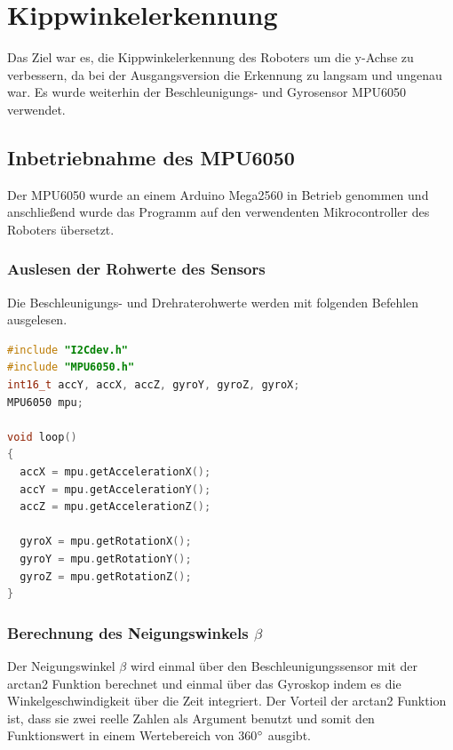 

\newpage
\renewcommand{\autoren}{Severin Schendel}

\section{Kippwinkelerkennung}

Das Ziel war es, die Kippwinkelerkennung des Roboters um die y-Achse zu verbessern, da bei der Ausgangsversion die Erkennung zu langsam und ungenau war. Es wurde weiterhin der Beschleunigungs- und Gyrosensor MPU6050 verwendet.

\subsection{Inbetriebnahme des MPU6050}
Der MPU6050 wurde an einem Arduino Mega2560 in Betrieb genommen und anschließend wurde das Programm auf den verwendenten Mikrocontroller des Roboters übersetzt.
\subsubsection{Auslesen der Rohwerte des Sensors}
Die Beschleunigungs- und Drehraterohwerte werden mit folgenden Befehlen ausgelesen.
\begin{lstlisting}[language=C++, caption=Auslesen der Sensorwerte, label={lst:Sensorwerte}]
#include "I2Cdev.h"
#include "MPU6050.h"
int16_t accY, accX, accZ, gyroY, gyroZ, gyroX;
MPU6050 mpu;

void loop() 
{
  accX = mpu.getAccelerationX();
  accY = mpu.getAccelerationY();
  accZ = mpu.getAccelerationZ(); 
  
  gyroX = mpu.getRotationX();
  gyroY = mpu.getRotationY();
  gyroZ = mpu.getRotationZ();
}
\end{lstlisting}

\subsubsection{Berechnung des Neigungswinkels \(\beta\)}
Der Neigungswinkel \(\beta\) wird einmal über den Beschleunigungssensor mit der arctan2 Funktion berechnet und einmal über das Gyroskop indem es die Winkelgeschwindigkeit über die Zeit integriert. Der Vorteil der arctan2 Funktion ist, dass sie zwei reelle Zahlen als Argument benutzt und somit den Funktionswert in einem Wertebereich von 360\(\degree\) ausgibt.

